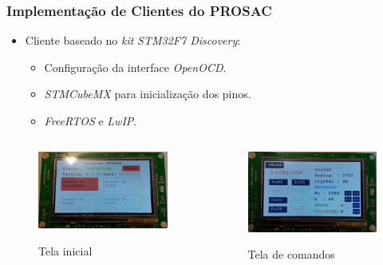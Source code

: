 \begin{frame}
\frametitle {Implementação de Clientes do PROSAC}

\begin{itemize}
  \item Cliente baseado no \textit{kit} \textit{STM32F7 Discovery}:	
  
  \begin{itemize} 
  \item Configuração da interface \textit{OpenOCD}.
  \item \textit{STMCubeMX} para inicialização dos pinos.
  \item \textit{FreeRTOS} e \textit{LwIP}.
  \end{itemize}
\end{itemize}

\begin{columns}
\begin{column}{0.49\textwidth}
	\begin{figure}
	\centering
	\includegraphics[width=\textwidth]{image/stm32}
	\label{fig:1}
	\caption{Tela inicial}
	\end{figure}
\end{column}
\begin{column}{0.49\textwidth}
	\begin{figure}
	\centering
	\includegraphics[width=\textwidth]{image/stm32-2}
	\label{fig:2}
	\caption {Tela de comandos}
	\end{figure}
\end{column}
\end{columns}
\end{frame}